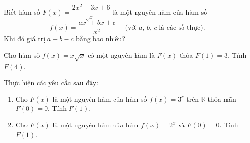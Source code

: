 \begin{bt}%
	Biết hàm số $F(x)=\dfrac{2 x^2-3 x+6}{x}$ là một nguyên hàm của hàm  số $$f(x)=\dfrac{a x^2+b x+c}{x^2} \quad \text{ (với $a$, $b$, $c$ là các số thực)}.$$
	Khi đó  giá trị $a+b-c$ bằng bao nhiêu?
\end{bt}

\begin{bt}%
	Cho hàm  số $f(x) = x\sqrt{x}$ có một nguyên hàm là $F(x)$ thỏa $F(1) = 3$. Tính $F(4)$.
\end{bt}

\begin{bt}%
	Thực hiện các yêu cầu sau  đây:
	\begin{enumerate}
		\item Cho $F(x)$ là một nguyên hàm của hàm số $  f(x)={3^x}$ trên $\mathbb{R}$ thỏa mãn $F(0)=0$. Tính $F(1)$.
		\item Cho $F(x)$  là một nguyên hàm của hàm $ f(x)={2^x}$ và $F(0)=0$. Tính $F(1)$.
	\end{enumerate}
\end{bt}

